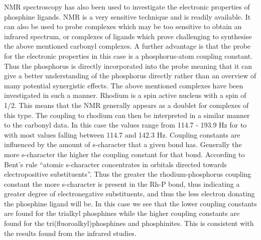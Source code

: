 NMR spectroscopy has also been used to investigate the electronic properties of phosphine ligands.  \phosphorus{} NMR is a very sensitive technique and is readily available.  It can also be used to probe complexes which may be too sensitive to obtain an infrared spectrum, or complexes of ligands which prove challenging to synthesise the above mentioned carbonyl complexes.  A further advantage is that the probe for the electronic properties in this case is a phosphorus-atom coupling constant.  Thus the phosphorus is directly incorporated into the probe meaning that it can give a better understanding of the phosphorus directly rather than an overview of many potential synergistic effects.  The above mentioned \ce{[Rh(CO)Cl(L)2]} complexes have been investigated in such a manner.  Rhodium is a spin active nucleus with a spin of 1/2.  This means that the \phosphorus{} NMR generally appears as a doublet for complexes of this type.  The coupling to rhodium can then be interpreted in a similar manner to the carbonyl data.  In this case the values range from 114.7 - 193.9 Hz for  to  with most values falling between 114.7 and 142.3 Hz.  Coupling constants are influenced by the amount of s-character that a given bond has.  Generally the more s-character the higher the coupling constant for that bond.  According to Bent's rule ``atomic s-character concentrates in orbitals directed towards electropositive substituents''.  Thus the greater the rhodium-phosphorus coupling constant the more s-character is present in the Rh-P bond, thus indicating a greater degree of electronegative substituents, and thus the less electron donating the phosphine ligand will be.  In this case we see that the lower coupling constants are found for the trialkyl phosphines while the higher coupling constants are found for the tri(fluoroalkyl)phosphines and phosphinites.  This is consistent with the results found from the infrared studies.  


